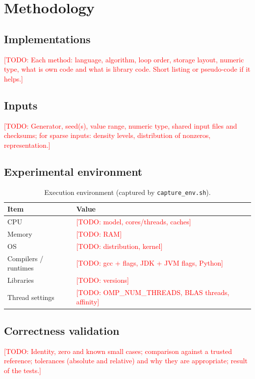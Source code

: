 \documentclass[conference,a4paper]{IEEEtran}
\newcommand{\todo}[1]{\textcolor{red}{[TODO: #1]}}
\begin{document}
{%
\section{Methodology}
\label{sec:method}

\subsection{Implementations}
\todo{Each method: language, algorithm, loop order, storage layout, numeric type, what is own code and what
is library code. Short listing or pseudo-code if it helps.}

\subsection{Inputs}
\todo{Generator, seed(s), value range, numeric type, shared input files and checksums; for sparse inputs:
density levels, distribution of nonzeros, representation.}

\subsection{Experimental environment}
\begin{table}[t]
\centering
\caption{Execution environment (captured by \texttt{capture\_env.sh}).}
\label{tab:env}
\small
\begin{tabular}{@{}ll@{}}
\toprule
Item & Value \\
\midrule
CPU & \todo{model, cores/threads, caches} \\
Memory & \todo{RAM} \\
OS & \todo{distribution, kernel} \\
Compilers / runtimes & \todo{gcc + flags, JDK + JVM flags, Python} \\
Libraries & \todo{versions} \\
Thread settings & \todo{OMP\_NUM\_THREADS, BLAS threads, affinity} \\
\bottomrule
\end{tabular}
\end{table}

\subsection{Correctness validation}
\todo{Identity, zero and known small cases; comparison against a trusted reference; tolerances
(absolute and relative) and why they are appropriate; result of the tests.}

}
\end{document}
